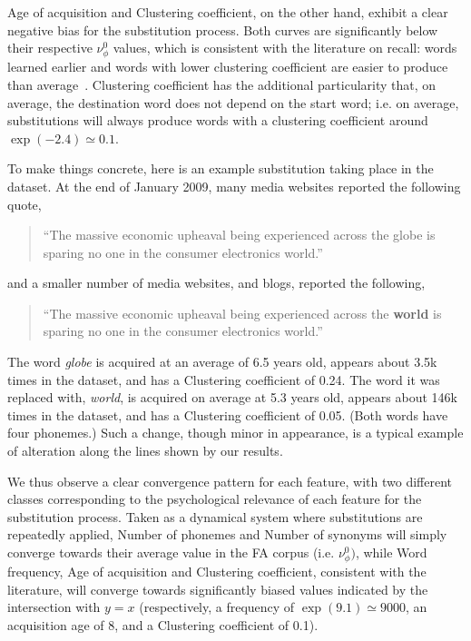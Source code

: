 Age of acquisition and Clustering coefficient, on the other hand, exhibit a clear negative bias for the substitution process. Both curves are significantly below their respective $\nu_{\phi}^0$ values, which is consistent with the literature on recall: words learned earlier and words with lower clustering coefficient are easier to produce than average~\citep{nelson2013activation,Zevin02}.
Clustering coefficient has the additional particularity that, on average, the destination word does not depend on the start word; i.e. on average, substitutions will always produce words with a clustering coefficient around $\exp(-2.4) \simeq 0.1$.

To make things concrete, here is an example substitution taking place in the dataset.
At the end of January 2009, many media websites reported the following quote,

\begin{quote}
    ``The massive economic upheaval being experienced across the globe is sparing no one in the consumer electronics world.''
\end{quote}
and a smaller number of media websites, and blogs, reported the following,
\begin{quote}
    ``The massive economic upheaval being experienced across the \textbf{world} is sparing no one in the consumer electronics world.''
\end{quote}
The word \emph{globe} is acquired at an average of 6.5 years old, appears about 3.5k times in the dataset, and has a Clustering coefficient of 0.24.
The word it was replaced with, \emph{world}, is acquired on average at 5.3 years old, appears about 146k times in the dataset, and has a Clustering coefficient of 0.05. (Both words have four phonemes.)
Such a change, though minor in appearance, is a typical example of alteration along the lines shown by our results.


\medskip
We thus observe a clear convergence pattern for each feature, with two different classes corresponding to the psychological relevance of each feature for the substitution process.
Taken as a dynamical system where substitutions are repeatedly applied, Number of phonemes and Number of synonyms will simply converge towards their average value in the FA corpus (i.e. $\nu_{\phi}^0)$, while Word frequency, Age of acquisition and Clustering coefficient, consistent with the literature, will converge towards significantly biased values indicated by the intersection with $y = x$ (respectively, a frequency of $\exp(9.1) \simeq 9000$, an acquisition age of 8, and a Clustering coefficient of 0.1).

